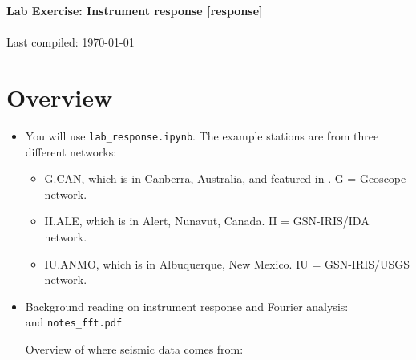 \documentclass[11pt,titlepage,fleqn]{article}
\newcommand{\tfile}{{\tt lab\_response.ipynb}}
\begin{document}

\begin{spacing}{1.2}
\centering
{\large \bf Lab Exercise: Instrument response [response]} \\
\cltag\ \\
Last compiled: \today
\end{spacing}


\section{Overview}

\begin{itemize}

\item You will use \tfile. The example stations are from three different networks:
%
\begin{itemize}
\item G.CAN, which is in Canberra, Australia, and featured in \citet[][Figure~1]{Park2005}. G = Geoscope network.
\item II.ALE, which is in Alert, Nunavut, Canada. II = GSN-IRIS/IDA network.
\item IU.ANMO, which is in Albuquerque, New Mexico. IU = GSN-IRIS/USGS network.
\end{itemize}


\item Background reading on instrument response and Fourier analysis: \\ \citet[][Ch.~6]{SteinWysession} and \verb+notes_fft.pdf+

Overview of where seismic data comes from: \citet{RinglerBastien2020}





\end{itemize}
\end{document}
